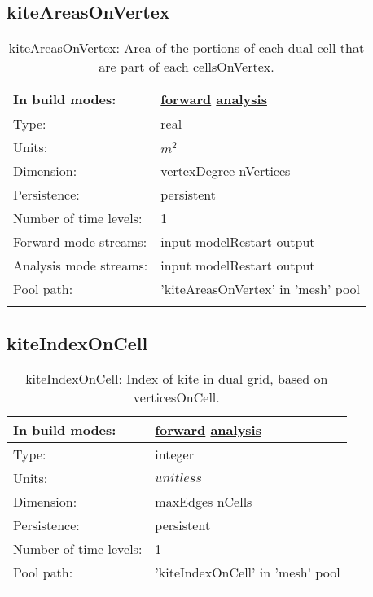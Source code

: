\subsection[kiteAreasOnVertex]{kiteAreasOnVertex}
\label{subsec:var_sec_mesh_kiteAreasOnVertex}
\begin{center}
\begin{longtable}{| p{2.0in} | p{4.0in} |}
        \hline 
        In build modes: & \hyperref[subsec:forward_var_tab_mesh]{forward} \hyperref[subsec:analysis_var_tab_mesh]{analysis} \\
        \hline 
        Type: & real \\
        \hline 
        Units: & $m^2$ \\
        \hline 
        Dimension: & vertexDegree nVertices \\
        \hline 
        Persistence: & persistent \\
        \hline 
        Number of time levels: & 1 \\
        \hline 
		 Forward mode streams: &  input modelRestart output \\
        \hline 
		 Analysis mode streams: &  input modelRestart output \\
        \hline 
            Pool path: & 'kiteAreasOnVertex' in 'mesh' pool
 \\
		 \hline 
    \caption{kiteAreasOnVertex: Area of the portions of each dual cell that are part of each cellsOnVertex.}
\end{longtable}
\end{center}
\subsection[kiteIndexOnCell]{kiteIndexOnCell}
\label{subsec:var_sec_mesh_kiteIndexOnCell}
\begin{center}
\begin{longtable}{| p{2.0in} | p{4.0in} |}
        \hline 
        In build modes: & \hyperref[subsec:forward_var_tab_mesh]{forward} \hyperref[subsec:analysis_var_tab_mesh]{analysis} \\
        \hline 
        Type: & integer \\
        \hline 
        Units: & $unitless$ \\
        \hline 
        Dimension: & maxEdges nCells \\
        \hline 
        Persistence: & persistent \\
        \hline 
        Number of time levels: & 1 \\
        \hline 
            Pool path: & 'kiteIndexOnCell' in 'mesh' pool
 \\
		 \hline 
    \caption{kiteIndexOnCell: Index of kite in dual grid, based on verticesOnCell.}
\end{longtable}
\end{center}
